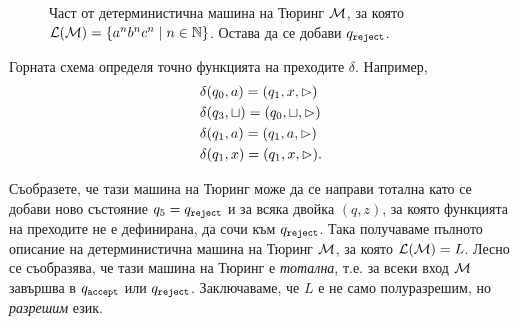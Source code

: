 \begin{example}
  \begin{framed}
  \begin{figure}[H]
    \begin{center}
    \end{center}
    \caption{Част от детерминистична машина на Тюринг $\mathcal{M}$, за която $\mathcal{L}(\mathcal{M}) = \{a^nb^nc^n \mid n \in \mathbb{N}\}$. Остава да се добави $q_{\texttt{reject}}$.}
  \end{figure}
  \end{framed}

  Горната схема определя точно функцията на преходите $\delta$. Например,
  \begin{align*}
    & \delta(q_0, a) = (q_1, x, \rhd)\\
    & \delta(q_3, \sqcup) = (q_0, \sqcup, \rhd)\\
    & \delta(q_1, a) = (q_1, a, \rhd)\\
    & \delta(q_1, x) = (q_1, x, \rhd).
  \end{align*}

  Съобразете, че тази машина на Тюринг може да се направи тотална като се добави ново състояние $q_5 = q_{\texttt{reject}}$
  и за всяка двойка $(q,z)$, за която функцията на преходите не е дефинирана, да сочи към $q_{\texttt{reject}}$.
  Така получаваме пълното описание на детерминистична машина на Тюринг $\mathcal{M}$, за която $\mathcal{L}(\mathcal{M}) = L$.
  Лесно се съобразява, че тази машина на Тюринг е {\em тотална}, т.е. за всеки вход $\mathcal{M}$ завършва в $q_{\texttt{accept}}$ или $q_{\texttt{reject}}$.
  Заключаваме, че $L$ е не само полуразрешим, но {\em разрешим} език.


\end{example}
